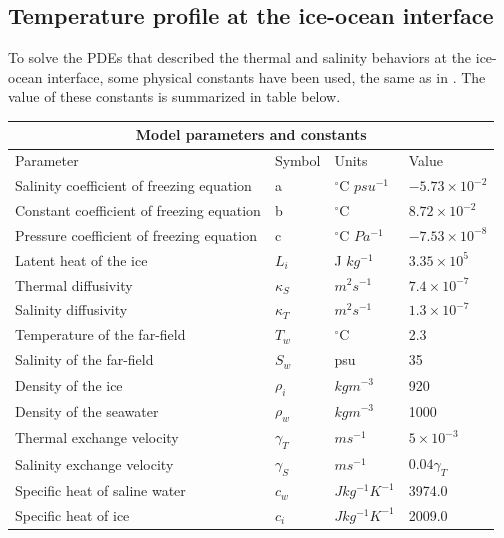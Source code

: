 \documentclass[11pt,a4paper]{article}
\begin{document}
	\subsection{Temperature profile at the ice-ocean interface}
	
	To solve the PDEs that described the thermal and salinity behaviors at the ice-ocean interface, some physical constants have been used, the same as in \cite{jenkins2001role}. The value of these constants is summarized in table below.\\
	
	\begin{tabular}{ |p{8cm}||p{2cm}|p{3cm}|p{3cm}|}
     \hline
     \multicolumn{4}{|c|}{Model parameters and constants} \\
     \hline
     Parameter &Symbol&Units&Value\\
     \hline
     Salinity coefficient of freezing equation &a& $^{\circ}$C $psu^{-1}$&   $-5.73\times10^{-2}$\\
     Constant coefficient of freezing equation &b&  $^{\circ}$C  & $8.72\times 10^{-2}$\\
     Pressure coefficient of freezing equation& c&$^{\circ}$C $Pa^{-1} $& $-7.53\times10^{-8}$\\
     Latent heat of the ice    & $L_i$ & J $kg^{-1}$& $3.35\times 10^{5}$\\
     Thermal diffusivity& $\kappa_S$  & $m^2 s^{-1}$&$7.4\times 10^{-7}$\\
     Salinity diffusivity & $\kappa_T$  & $m^2 s^{-1}$   &$1.3\times 10^{-7}$\\
     Temperature of the far-field& $T_w$  & $^{\circ}$C & 2.3\\
     Salinity of the far-field&$S_w$& psu&  35  \\
     Density of the ice & $\rho_i$& $kg m^{-3}$& 920\\
     Density of the seawater & $\rho_w$ & $kg m^{-3}$& 1000\\
     Thermal exchange velocity & $\gamma_T$ & $m s^{-1}$& $5\times 10^{-3}$\\
     Salinity exchange velocity & $\gamma_S$ & $m s^{-1}$& $0.04\gamma_T$ \\
     Specific heat of saline water& $c_w$ & $J kg^{-1}K^{-1}$ & 3974.0\\
     Specific heat of ice & $c_i$ & $J kg^{-1} K^{-1}$ & 2009.0\\
     \hline
    \end{tabular}
    
\end{document}
